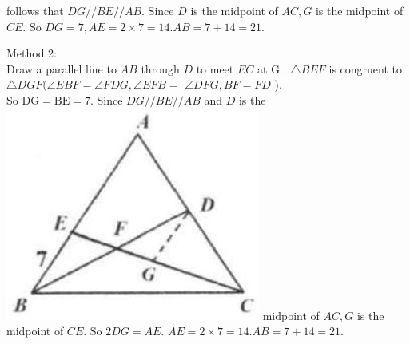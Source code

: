 \documentclass[10pt]{article}
\begin{document}
follows that \(D G / / B E / / A B\). Since \(D\) is the midpoint of \(A C, G\) is the midpoint of \(C E\). So \(D G=7, A E=2 \times 7=14 . A B=7+14=21\).

Method 2:\\
Draw a parallel line to \(A B\) through \(D\) to meet \(E C\) at G . \(\triangle B E F\) is congruent to \(\triangle D G F(\angle E B F=\angle F D G, \angle E F B=\) \(\angle D F G, B F=F D\) ).\\
So \(\mathrm{DG}=\mathrm{BE}=7\). Since \(D G / / B E / / A B\) and \(D\) is the\\
\includegraphics[max width=\textwidth]{2025_04_17_97bc1f7e44d93c271a88g-133} midpoint of \(A C, G\) is the midpoint of \(C E\). So \(2 D G=A E\). \(A E=2 \times 7=14 . A B=7+14=21\).
\end{document}
